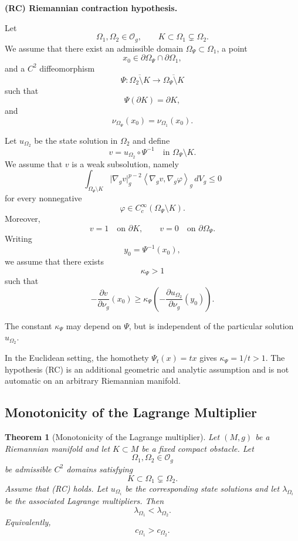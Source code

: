 \documentclass[11pt,a4paper]{article}
\newtheorem{theorem}{Theorem}[section]
\theoremstyle{definition}
\theoremstyle{remark}
\newcommand{\Og}{\mathcal{O}_g}
\newcommand{\gradg}{\nabla_g}
\newcommand{\normg}[1]{\lvert #1\rvert_g}
\newcommand{\ipg}[2]{\left\langle #1,#2\right\rangle_g}
\begin{document}
\medskip
\noindent
\textbf{(RC) Riemannian contraction hypothesis.}

Let
\[
\Omega_1,\Omega_2\in\Og,
\qquad
K\subset\Omega_1\subsetneq\Omega_2.
\]
We assume that there exist an admissible domain
$\Omega_\Psi\subset\Omega_1$, a point
\[
x_0\in\partial\Omega_\Psi\cap\partial\Omega_1,
\]
and a $C^2$ diffeomorphism
\[
\Psi:
\overline{\Omega_2\setminus K}
\longrightarrow
\overline{\Omega_\Psi\setminus K}
\]
such that
\[
\Psi(\partial K)=\partial K,
\]
and
\[
\nu_{\Omega_\Psi}(x_0)
=
\nu_{\Omega_1}(x_0).
\]

Let $u_{\Omega_2}$ be the state solution in $\Omega_2$ and define
\[
v=u_{\Omega_2}\circ\Psi^{-1}
\quad\text{in }\Omega_\Psi\setminus K.
\]
We assume that $v$ is a weak subsolution, namely
\begin{equation}
\int_{\Omega_\Psi\setminus K}
\normg{\gradg v}^{p-2}
\ipg{\gradg v}{\gradg\varphi}
\,dV_g
\leq0
\label{eq:RC-subsolution}
\end{equation}
for every nonnegative
\[
\varphi\in C_c^\infty(\Omega_\Psi\setminus K).
\]
Moreover,
\[
v=1\quad\text{on }\partial K,
\qquad
v=0\quad\text{on }\partial\Omega_\Psi.
\]
Writing
\[
y_0=\Psi^{-1}(x_0),
\]
we assume that there exists
\[
\kappa_\Psi>1
\]
such that
\begin{equation}
-\frac{\partial v}{\partial\nu_g}(x_0)
\geq
\kappa_\Psi
\left(
-\frac{\partial u_{\Omega_2}}{\partial\nu_g}(y_0)
\right).
\label{eq:RC-flux}
\end{equation}

The constant $\kappa_\Psi$ may depend on $\Psi$, but is independent
of the particular solution $u_{\Omega_2}$.

In the Euclidean setting, the homothety $\Psi_t(x)=tx$ gives
$\kappa_\Psi=1/t>1$. The hypothesis (RC) is an additional geometric
and analytic assumption and is not automatic on an arbitrary
Riemannian manifold.

\subsection{Monotonicity of the Lagrange Multiplier}

\begin{theorem}[Monotonicity of the Lagrange multiplier]
\label{thm:monotonicity-lambda}
Let $(M,g)$ be a Riemannian manifold and let $K\subset M$ be a fixed
compact obstacle. Let
\[
\Omega_1,\Omega_2\in\Og
\]
be admissible $C^2$ domains satisfying
\[
K\subset\Omega_1\subsetneq\Omega_2.
\]
Assume that \textnormal{(RC)} holds. Let $u_{\Omega_i}$ be the
corresponding state solutions and let $\lambda_{\Omega_i}$ be the
associated Lagrange multipliers. Then
\[
\lambda_{\Omega_1}<\lambda_{\Omega_2}.
\]
Equivalently,
\[
c_{\Omega_1}>c_{\Omega_2}.
\]
\end{theorem}
\end{document}
